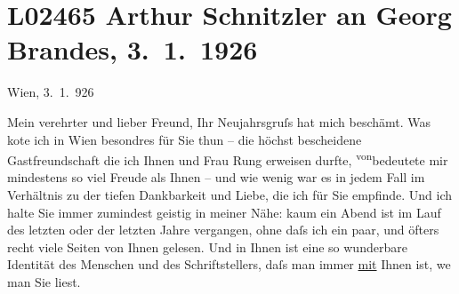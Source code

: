 

\section[Arthur Schnitzler an Georg Brandes, 3. 1. 1926]{L02465 Arthur Schnitzler an Georg Brandes, 3. 1. 1926}
\nopagebreak{}
\rehead{ }\normalsize\beginnumbering{}
\toendnotes[C]{\smallbreak\pagebreak[2]}
\toendnotes[C]{\smallbreak}
\pstart
           \raggedleft{}{\pb}Wien, 3. 1. 926\pend
           
\pstart{}Mein verehrter und lieber Freund,\pend\vspace{0.5em}
\pstart
           Ihr Neujahrsgruſs hat mich beschämt. Was ko{\geminationn}te ich in
                  Wien besondres für Sie thun – die höchst
               bescheidene Gastfreundschaft die ich Ihnen und Frau Rung erweisen durfte, \substVorne{}\textsuperscript{von}\substDazwischen{}bedeutete\substHinten{} mir mindestens so viel Freude als Ihnen – und wie wenig war es in jedem Fall
               im Verhältnis zu der tiefen Dankbarkeit und Liebe, die ich für Sie empfinde. Und ich
               halte Sie immer zumindest geistig in meiner Nähe: kaum ein Abend ist im Lauf des
               letzten oder der letzten Jahre vergangen, ohne daſs ich ein paar, und öfters recht
               viele Seiten von Ihnen gelesen. Und in Ihnen ist eine so wunder{\pb}bare Identität des Menschen und des
               Schriftstellers, daſs man immer \uline{mit} Ihnen ist, we{\geminationn} man Sie liest.\pend
           
